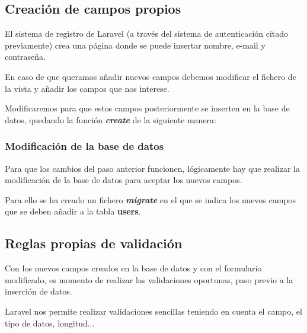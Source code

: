 \documentclass{\ClassPath/viu-tfm-template}
\begin{document}
\subsection{Creación de campos propios}
El sistema de registro de Laravel (a través del sistema de autenticación citado previamente) crea una página donde se puede insertar nombre, e-mail y contraseña.

En caso de que queramos añadir nuevos campos debemos modificar el fichero de la vista  y añadir los campos que nos interese.

Modificaremos  para que estos campos posteriormente se inserten en la base de datos, quedando la función \textit{\textbf{create}} de la siguiente manera:





\subsubsection{Modificación de la base de datos}
Para que los cambios del paso anterior funcionen, lógicamente hay que realizar la modificación de la base de datos para aceptar los nuevos campos.

Para ello se ha creado un fichero \textbf{\textit{migrate}} en el que se indica  los nuevos campos que se deben añadir a la tabla \textbf{users}.


\subsection{Reglas propias de validación}
Con los nuevos campos creados en la base de datos y con el formulario modificado, es momento de realizar las validaciones oportunas, paso previo a la inserción de datos.

Laravel nos permite realizar validaciones sencillas teniendo en cuenta el campo, el tipo de datos, longitud...
\end{document}
